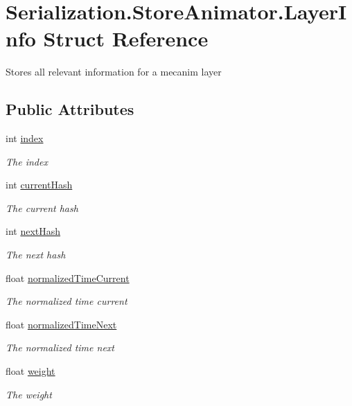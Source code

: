 \hypertarget{struct_serialization_1_1_store_animator_1_1_layer_info}{}\section{Serialization.\+Store\+Animator.\+Layer\+Info Struct Reference}
\label{struct_serialization_1_1_store_animator_1_1_layer_info}


Stores all relevant information for a mecanim layer  


\subsection*{Public Attributes}
\begin{DoxyCompactItemize}
\item 
int \hyperlink{struct_serialization_1_1_store_animator_1_1_layer_info_a03ed7c42b4051323c4889b7e3ea30d48}{index}
\begin{DoxyCompactList}\small\item\em The index \end{DoxyCompactList}\item 
int \hyperlink{struct_serialization_1_1_store_animator_1_1_layer_info_ace4db26f7ebb0bfd8d40345db7cf85cb}{current\+Hash}
\begin{DoxyCompactList}\small\item\em The current hash \end{DoxyCompactList}\item 
int \hyperlink{struct_serialization_1_1_store_animator_1_1_layer_info_a25d56522523daf48c57a371a4658dde7}{next\+Hash}
\begin{DoxyCompactList}\small\item\em The next hash \end{DoxyCompactList}\item 
float \hyperlink{struct_serialization_1_1_store_animator_1_1_layer_info_ad063f7703ff869cefe44bf3e3738f45f}{normalized\+Time\+Current}
\begin{DoxyCompactList}\small\item\em The normalized time current \end{DoxyCompactList}\item 
float \hyperlink{struct_serialization_1_1_store_animator_1_1_layer_info_a671f64fd7b40c607b3d42225739eda26}{normalized\+Time\+Next}
\begin{DoxyCompactList}\small\item\em The normalized time next \end{DoxyCompactList}\item 
float \hyperlink{struct_serialization_1_1_store_animator_1_1_layer_info_ad0087ef8c96647084a226b5d50355f69}{weight}
\begin{DoxyCompactList}\small\item\em The weight \end{DoxyCompactList}\end{DoxyCompactItemize}



